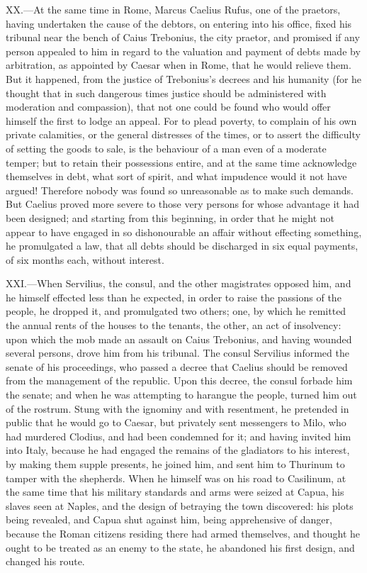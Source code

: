 XX.—At the same time in Rome, Marcus Caelius Rufus, one of the
praetors, having undertaken the cause of the debtors, on entering into
his office, fixed his tribunal near the bench of Caius Trebonius, the
city praetor, and promised if any person appealed to him in regard to
the valuation and payment of debts made by arbitration, as appointed by
Caesar when in Rome, that he would relieve them. But it happened, from
the justice of Trebonius's decrees and his humanity (for he thought that
in such dangerous times justice should be administered with moderation
and compassion), that not one could be found who would offer himself the
first to lodge an appeal. For to plead poverty, to complain of his own
private calamities, or the general distresses of the times, or to assert
the difficulty of setting the goods to sale, is the behaviour of a man
even of a moderate temper; but to retain their possessions entire, and
at the same time acknowledge themselves in debt, what sort of spirit,
and what impudence would it not have argued! Therefore nobody was found
so unreasonable as to make such demands. But Caelius proved more severe
to those very persons for whose advantage it had been designed; and
starting from this beginning, in order that he might not appear to have
engaged in so dishonourable an affair without effecting something, he
promulgated a law, that all debts should be discharged in six equal
payments, of six months each, without interest.

XXI.—When Servilius, the consul, and the other magistrates opposed him,
and he himself effected less than he expected, in order to raise the
passions of the people, he dropped it, and promulgated two others; one,
by which he remitted the annual rents of the houses to the tenants, the
other, an act of insolvency: upon which the mob made an assault on Caius
Trebonius, and having wounded several persons, drove him from his
tribunal. The consul Servilius informed the senate of his proceedings,
who passed a decree that Caelius should be removed from the management
of the republic. Upon this decree, the consul forbade him the senate;
and when he was attempting to harangue the people, turned him out of the
rostrum. Stung with the ignominy and with resentment, he pretended in
public that he would go to Caesar, but privately sent messengers to
Milo, who had murdered Clodius, and had been condemned for it; and
having invited him into Italy, because he had engaged the remains of the
gladiators to his interest, by making them supple presents, he joined
him, and sent him to Thurinum to tamper with the shepherds. When he
himself was on his road to Casilinum, at the same time that his military
standards and arms were seized at Capua, his slaves seen at Naples, and
the design of betraying the town discovered: his plots being revealed,
and Capua shut against him, being apprehensive of danger, because the
Roman citizens residing there had armed themselves, and thought he ought
to be treated as an enemy to the state, he abandoned his first design,
and changed his route.

